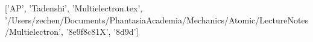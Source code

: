 ['AP', 'Tadenshi', 'Multielectron.tex', '/Users/zechen/Documents/PhantasiaAcademia/Mechanics/Atomic/LectureNotes/Multielectron', '\x8e\x9f\xad{}\xbd{}\xba{}\x8c\xbe\x81X\xba\xbf', '\x8d\xba{}\x9d']
